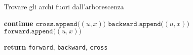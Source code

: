 \documentclass[a4paper, 12pt]{report}
\begin{document}
\begin{framedalgo}[breakable]{Trovare gli archi fuori dall'arborescenza}
\begin{algorithmic}[1]
                            \State \textbf{continue} 
                            \State $\texttt{cross.append(}(u, x)\texttt{)}$
                            \State $\texttt{backward.append(}(u, x)\texttt{)}$
                        \Else
                            \State $\texttt{forward.append(}(u, x)\texttt{)}$
                        \EndIf
                    \EndFor
                \EndFor

                \State \textbf{return} \texttt{forward}, \texttt{backward}, \texttt{cross}
            \EndFunction
        \end{algorithmic}
    \end{framedalgo}
\end{document}
